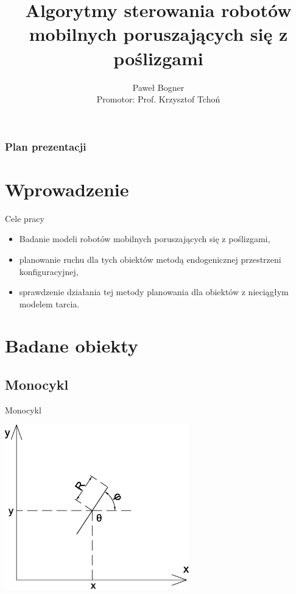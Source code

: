 \documentclass{beamer}
\title[Roboty mobilne poruszające się z poślizgami]{Algorytmy sterowania robotów mobilnych poruszających się z poślizgami}
\author[Paweł Bogner]{Paweł Bogner\\ \vspace{5pt}\footnotesize Promotor: Prof. Krzysztof Tchoń\\ }
\institute[]{
  Politechnika Wrocławska\\
  Wydział Elektroniki\\
  Automatyka i Robotyka\\
  Robotyka
}
\date{}
\begin{document}
\begin{frame}[plain]
  \titlepage
\end{frame}

\begin{frame}
  \frametitle{Plan prezentacji}
  \tableofcontents
\end{frame}

\section{Wprowadzenie}
\begin{frame}{Cele pracy}
\begin{itemize}
\item Badanie modeli robotów mobilnych poruszających się z poślizgami,
\item planowanie ruchu dla tych obiektów metodą endogenicznej przestrzeni konfiguracyjnej,
\item sprawdzenie działania tej metody planowania dla obiektów z nieciągłym modelem tarcia.
\end{itemize}
\end{frame}

\section{Badane obiekty}
\subsection{Monocykl}
\begin{frame}{Monocykl}
\begin{center}
\includegraphics[width=0.6\textwidth]{img/uni.eps}
\end{center}
\end{frame}
\end{document}
